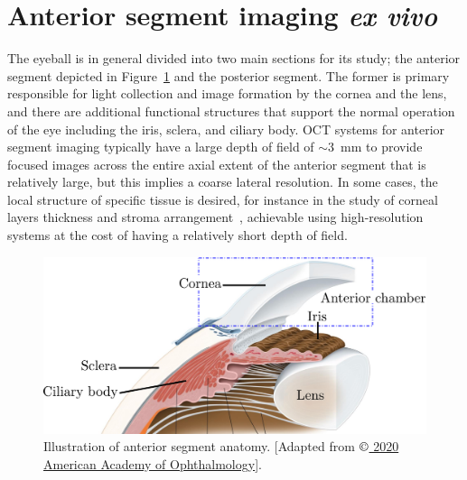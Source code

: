 \section{Anterior segment imaging \textit{ex vivo}}

The eyeball is in general divided into two main sections for its study; the anterior segment depicted in Figure~\ref{fig:eyeSchematic} and the posterior segment. The former is primary responsible for light collection and image formation by the cornea and the lens, and there are additional functional structures that support the normal operation of the eye including the iris, sclera, and ciliary body. OCT systems  for anterior segment imaging typically have a large depth of field of $\sim$3~mm to provide focused images across the entire axial extent of the anterior segment that is relatively large, but this implies a coarse lateral resolution. In some cases, the local structure of specific tissue is desired, for instance in the study of corneal layers thickness and stroma arrangement~\cite{Huang2015_Anterior}, achievable using high-resolution systems at the cost of having a relatively short depth of field.

\begin{figure}[htb!]
	\centering
	\includegraphics[width=.65\textwidth]{Figures/Results/EyeSchematic.pdf}
	\caption[Illustration of anterior segment anatomy.]{Illustration of anterior segment anatomy. [Adapted from \href{https://www.aao.org/image/anterior-segment-anatomy}{$\copyright$ 2020 American Academy of Ophthalmology}].}
	\label{fig:eyeSchematic}
\end{figure}

